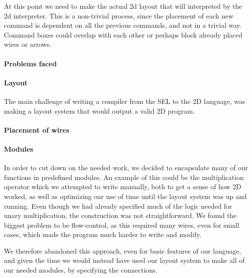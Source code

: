 At this point we need to make the actual 2d layout that will
interpreted by the 2d interpreter. This is a non-trivial process,
since the placement of each new command is dependent on all the
previous commands, and not in a trivial way. Command boxes could
overlap with each other or perhaps block already placed wires or
arrows.

\paragraph{Problems faced}
\label{compiler:problems}

\paragraph{Layout}
\label{compiler:layout}
The main challenge of writing a compiler from the SEL to the 2D
language, was making a layout system that would output a valid 2D program.

\paragraph{Placement of wires}
\label{compiler:placement}

\paragraph{Modules}
\label{compiler:modules}
In order to cut down on the needed work, we decided to encapsulate
many of our functions in predefined modules. An example of this could
be the multiplication operator which we attempted to write manually,
both to get a sense of how 2D worked, as well as optimizing our use of
time until the layout system was up and running. Even though we had
already specified much of the logic needed for unary multiplication,
the construction was not straightforward. We found the biggest
problem to be flow-control, as this required many wires, even for
small cases, which made the program much harder to write and modify.

We therefore abandoned this approach, even for basic features of our
language, and given the time we would instead have used our layout
system to make all of our needed modules, by specifying the connections.

